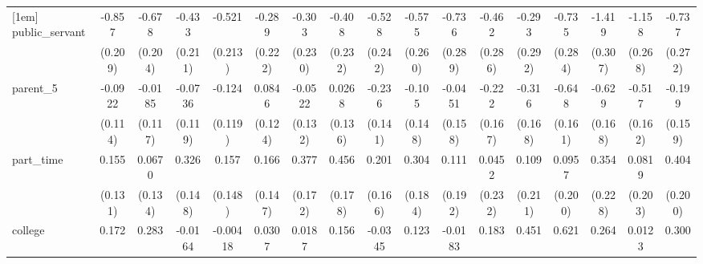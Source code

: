 {\begin{tabular}{l*{16}{c}}
[1em]
public\_servant      &      -0.857\sym{***}&      -0.678\sym{***}&      -0.433\sym{*}  &      -0.521\sym{*}  &      -0.289         &      -0.303         &      -0.408         &      -0.528\sym{*}  &      -0.575\sym{*}  &      -0.736\sym{*}  &      -0.462         &      -0.293         &      -0.735\sym{**} &      -1.419\sym{***}&      -1.158\sym{***}&      -0.737\sym{**} \\
                    &     (0.209)         &     (0.204)         &     (0.211)         &     (0.213)         &     (0.222)         &     (0.230)         &     (0.232)         &     (0.242)         &     (0.260)         &     (0.289)         &     (0.286)         &     (0.292)         &     (0.284)         &     (0.307)         &     (0.268)         &     (0.272)         \\
[1em]
parent\_5            &     -0.0922         &     -0.0185         &     -0.0736         &      -0.124         &      0.0846         &     -0.0522         &      0.0268         &      -0.236         &      -0.105         &     -0.0451         &      -0.222         &      -0.316         &      -0.648\sym{***}&      -0.629\sym{***}&      -0.517\sym{**} &      -0.199         \\
                    &     (0.114)         &     (0.117)         &     (0.119)         &     (0.119)         &     (0.124)         &     (0.132)         &     (0.136)         &     (0.141)         &     (0.148)         &     (0.158)         &     (0.167)         &     (0.168)         &     (0.161)         &     (0.168)         &     (0.162)         &     (0.159)         \\
[1em]
part\_time           &       0.155         &      0.0670         &       0.326\sym{*}  &       0.157         &       0.166         &       0.377\sym{*}  &       0.456\sym{*}  &       0.201         &       0.304         &       0.111         &      0.0452         &       0.109         &      0.0957         &       0.354         &      0.0819         &       0.404\sym{*}  \\
                    &     (0.131)         &     (0.134)         &     (0.148)         &     (0.148)         &     (0.147)         &     (0.172)         &     (0.178)         &     (0.166)         &     (0.184)         &     (0.192)         &     (0.232)         &     (0.211)         &     (0.200)         &     (0.228)         &     (0.203)         &     (0.200)         \\
[1em]
college             &       0.172         &       0.283         &     -0.0164         &    -0.00418         &      0.0307         &      0.0187         &       0.156         &     -0.0345         &       0.123         &     -0.0183         &       0.183         &       0.451\sym{*}  &       0.621\sym{**} &       0.264         &      0.0123         &       0.300         \\

\end{tabular}}
